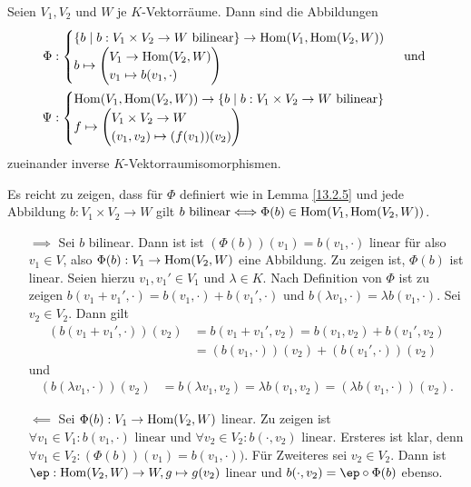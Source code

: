 \documentclass[../../main.tex]{subfiles}
\begin{document}
\begin{sat}\label{13.2.6}
	Seien $V_1,V_2$ und $W$ je $K$-Vektorräume. Dann sind die Abbildungen
	\begin{align*}
		\Phi&:\begin{cases}\{b\mid b: V_1\times V_2\to W\text{ bilinear}\}\to\Hom(V_1,\Hom(V_2,W))\\ b\mapsto\begin{pmatrix*}[l]V_1\to \Hom(V_2,W)\\ v_1\mapsto b(v_1,\cdot)\end{pmatrix*}\end{cases} \;\text{und}\;\\
		\Psi&:\begin{cases}\Hom(V_1,\Hom(V_2,W))\to \{b\mid b: V_1\times V_2\to W\text{ bilinear}\}\\ f\mapsto\begin{pmatrix*}[l]V_1\times V_2\to W\\ (v_1,v_2)\mapsto (f(v_1))(v_2)\end{pmatrix*}\end{cases}
	\end{align*}
	zueinander inverse $K$-Vektorraumisomorphismen.
\end{sat}
\begin{cproof}
	Es reicht zu zeigen, dass für $\Phi$ definiert wie in Lemma \ref{13.2.5} und jede Abbildung $b: V_1\times V_2\to W$ gilt $b\text{ bilinear} \Longleftrightarrow\Phi(b)\in \operatorname{Hom}(V_1,\operatorname{Hom}(V_2,W))$.
	\begin{itemize}
		\item[$\implies$] Sei $b$ bilinear. Dann ist ist $(\Phi(b))(v_1)=b(v_1,\cdot)$ linear für also $v_1\in V$, also $\Phi(b): V_1\to \operatorname{Hom}(V_2,W)$ eine Abbildung. Zu zeigen ist, $\Phi(b)$ ist linear. Seien hierzu $v_1,v_1'\in V_1$ und $\lambda\in K$. Nach Definition von $\Phi$ ist zu zeigen $b(v_1+v_1',\cdot)=b(v_1,\cdot)+b(v_1',\cdot)$ und $b(\lambda v_1,\cdot)=\lambda b(v_1,\cdot)$. Sei $v_2\in V_2$. Dann gilt
		\begin{align*}
			(b(v_1+v_1',\cdot))(v_2)&=b(v_1+v_1',v_2)=b(v_1,v_2)+b(v_1',v_2)\\
			&=(b(v_1,\cdot))(v_2)+(b(v_1',\cdot))(v_2)
		\end{align*}
		und
		\begin{align*}
			(b(\lambda v_1,\cdot))(v_2)&=b(\lambda v_1,v_2)=\lambda b(v_1,v_2)=(\lambda b(v_1,\cdot))(v_2).
		\end{align*}
		\item[$\impliedby$] Sei $\Phi(b): V_1\to \operatorname{Hom}(V_2,W)$ linear. Zu zeigen ist $\forall v_1\in V_1: b(v_1,\cdot)\text{ linear}$ und $\forall v_2\in V_2: b(\cdot, v_2)\text{ linear}$. Ersteres ist klar, denn $\forall v_1\in V_2: (\Phi(b))(v_1)=b(v_1,\cdot))$. Für Zweiteres sei $v_2\in V_2$. Dann ist $\ep: \Hom(V_2,W)\to W, g\mapsto g(v_2)$ linear und $b(\cdot,v_2)=\ep\circ \Phi(b)$ ebenso.
	\end{itemize}
\end{cproof}
\end{document}
